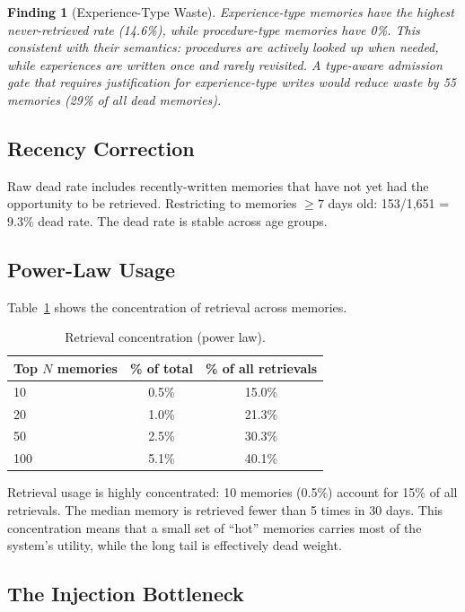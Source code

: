 \documentclass{llncs}
\newtheorem{finding}{Finding}
\begin{document}
\begin{finding}[Experience-Type Waste]
Experience-type memories have the highest never-retrieved rate (14.6\%), while procedure-type memories have 0\%. This consistent with their semantics: procedures are actively looked up when needed, while experiences are written once and rarely revisited. A type-aware admission gate that requires justification for experience-type writes would reduce waste by 55 memories (29\% of all dead memories).
\end{finding}

\subsection{Recency Correction}

Raw dead rate includes recently-written memories that have not yet had the opportunity to be retrieved. Restricting to memories $\geq 7$ days old: 153/1,651 = 9.3\% dead rate. The dead rate is stable across age groups.

\subsection{Power-Law Usage}


Table~\ref{tab:powerlaw} shows the concentration of retrieval across memories.

\begin{table}[h]
\centering
\caption{Retrieval concentration (power law).}
\label{tab:powerlaw}
\begin{tabular}{lcc}
\toprule
Top $N$ memories & \% of total & \% of all retrievals \\
\midrule
10 & 0.5\% & 15.0\% \\
20 & 1.0\% & 21.3\% \\
50 & 2.5\% & 30.3\% \\
100 & 5.1\% & 40.1\% \\
\bottomrule
\end{tabular}
\end{table}

Retrieval usage is highly concentrated: 10 memories (0.5\%) account for 15\% of all retrievals. The median memory is retrieved fewer than 5 times in 30 days. This concentration means that a small set of ``hot'' memories carries most of the system's utility, while the long tail is effectively dead weight.

\subsection{The Injection Bottleneck}
\end{document}
